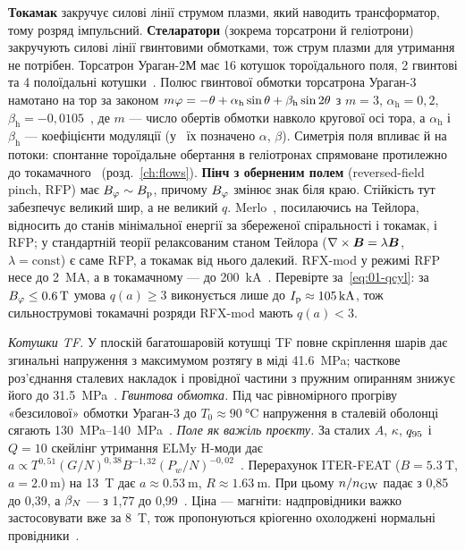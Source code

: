 \textbf{Токамак} закручує силові лінії струмом плазми, який наводить трансформатор,
тому розряд імпульсний. \textbf{Стеларатори} (зокрема торсатрони й геліотрони) закручують силові
лінії гвинтовими обмотками, тож струм плазми для утримання не потрібен. Торсатрон
Ураган-2М має 16 котушок тороїдального поля, 2 гвинтові та 4 полоїдальні
котушки~\cite{Martsenyuk2025}. Полюс гвинтової обмотки торсатрона Ураган-3 намотано
на тор за законом
$m\varphi=-\theta+\alpha_{\mathrm{h}}\sin\theta+\beta_{\mathrm{h}}\sin2\theta$ з $m=3$,
$\alpha_{\mathrm{h}}=0{,}2$, $\beta_{\mathrm{h}}=-0{,}0105$~\cite{Zaitsev2003}, де $m$ --- число обертів обмотки навколо кругової осі тора, а $\alpha_{\mathrm{h}}$ і
$\beta_{\mathrm{h}}$ --- коефіцієнти модуляції (у~\cite{Zaitsev2003} їх позначено $\alpha$, $\beta$).
Симетрія поля впливає й на потоки: спонтанне тороїдальне обертання в геліотронах
спрямоване протилежно до токамачного~\cite{Ida2001} (розд.~\ref{ch:flows}). \textbf{Пінч з оберненим полем} (reversed-field pinch, RFP) має
$B_{\varphi}\sim B_{\mathrm{p}}$, причому $B_{\varphi}$ змінює знак біля краю. Стійкість тут забезпечує
великий шир, а не великий $q$. Merlo~\cite{Merlo2011}, посилаючись на Тейлора, відносить до станів мінімальної енергії за
збереженої спіральності і токамак, і RFP; у стандартній теорії релаксованим станом Тейлора
($\nabla\times\bm{B}=\lambda\bm{B}$, $\lambda=\mathrm{const}$) є саме RFP, а токамак від нього
далекий. RFX-mod у режимі RFP несе до \SI{2}{\mega\ampere}, а в токамачному --- до
\SI{200}{\kilo\ampere}~\cite{Merlo2011}. Перевірте за~\eqref{eq:01-qcyl}: за
$B_{\varphi}\le\SI{0.6}{\tesla}$ умова $q(a)\ge3$ виконується лише до $I_{\mathrm{p}}\approx\SI{105}{\kilo\ampere}$,
тож сильнострумові токамачні розряди RFX-mod мають $q(a)<3$.

\begin{corpusexample}
\emph{Котушки TF.} У плоскій багатошаровій котушці TF повне скріплення шарів дає згинальні
напруження з максимумом розтягу в міді \SI{41.6}{\mega\pascal}; часткове роз'єднання
сталевих накладок і провідної частини з пружним опиранням знижує його до
\SI{31.5}{\mega\pascal}~\cite{Zaitsev2001}. \emph{Гвинтова обмотка.} Під час рівномірного
прогріву «безсилової» обмотки Ураган-3 до $T_0\approx\SI{90}{\celsius}$ напруження в сталевій
оболонці сягають \SIrange{130}{140}{\mega\pascal}~\cite{Zaitsev2003}. \emph{Поле як важіль
проєкту.} За сталих $A$, $\kappa$, $q_{95}$ і $Q=10$ скейлінг утримання ELMy H-моди дає
$a\propto T^{0{,}51}(G/N)^{0{,}38}B^{-1{,}32}(P_w/N)^{-0{,}02}$~\cite{Mazzucato2000}.
Перерахунок ITER-FEAT ($B=\SI{5.3}{\tesla}$, $a=\SI{2.0}{\metre}$) на \SI{13}{\tesla}
дає $a\approx\SI{0.53}{\metre}$, $R\approx\SI{1.63}{\metre}$. При цьому $n/n_{\mathrm{GW}}$ падає
з 0,85 до 0,39, а $\beta_{N}$ --- з 1,77 до 0,99~\cite{Mazzucato2000}. Ціна --- магніти: надпровідники важко
застосовувати вже за \SI{8}{\tesla}, тож пропонуються кріогенно охолоджені нормальні
провідники~\cite{Mazzucato2000}.
\end{corpusexample}

